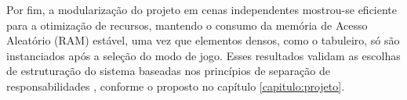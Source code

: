 Por fim, a modularização do projeto em cenas independentes mostrou-se eficiente para a otimização de recursos, mantendo o consumo da memória de Acesso Aleatório (RAM) estável, uma vez que elementos densos, como o tabuleiro, só são instanciados após a seleção do modo de jogo. Esses resultados validam as escolhas de estruturação do sistema baseadas nos princípios de separação de responsabilidades \cite{Fowler2006}, conforme o proposto no capítulo \ref{capitulo:projeto}.